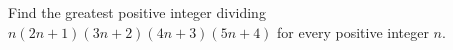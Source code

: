 Find the greatest positive integer dividing $ n(2n+1)(3n+2)(4n+3)(5n+4)$ for every positive integer $ n $.

